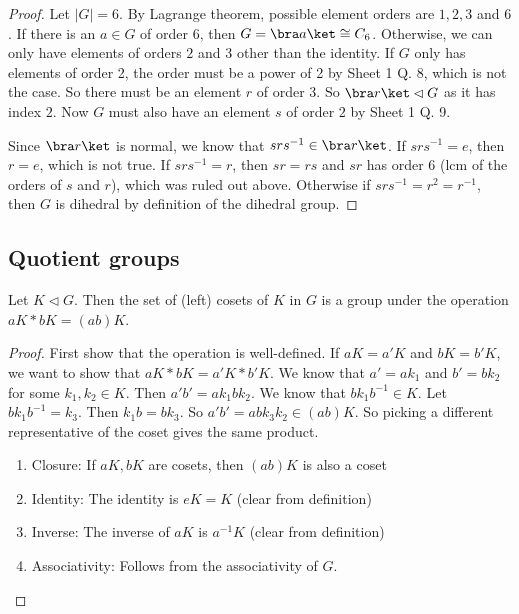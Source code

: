 \documentclass[a4paper]{article}
\begin{document}
\begin{proof}
  Let $|G| = 6$. By Lagrange theorem, possible element orders are $1, 2, 3$ and $6$. If there is an $a\in G$ of order $6$, then $G = \bra a\ket \cong C_6$. Otherwise, we can only have elements of orders $2$ and $3$ other than the identity. If $G$ only has elements of order 2, the order must be a power of 2 by Sheet 1 Q. 8, which is not the case. So there must be an element $r$ of order 3. So $\bra r\ket\lhd G$ as it has index $2$. Now $G$ must also have an element $s$ of order $2$ by Sheet 1 Q. 9.

  Since $\bra r\ket$ is normal, we know that $srs^{-1}\in \bra r\ket$. If $srs^{-1} = e$, then $r = e$, which is not true. If $srs^{-1} = r$, then $sr = rs$ and $sr$ has order $6$ (lcm of the orders of $s$ and $r$), which was ruled out above. Otherwise if $srs^{-1} = r^2 = r^{-1}$, then $G$ is dihedral by definition of the dihedral group.
\end{proof}

\subsection{Quotient groups}
\begin{prop}
  Let $K\lhd G$. Then the set of (left) cosets of $K$ in $G$ is a group under the operation $aK*bK = (ab)K$.
\end{prop}

\begin{proof}
  First show that the operation is well-defined. If $aK = a'K$ and $bK = b'K$, we want to show that $aK*bK = a'K * b'K$. We know that $a' = ak_1$ and $b' = bk_2$ for some $k_1, k_2\in K$. Then $a'b' = ak_1bk_2$. We know that $bk_1b^{-1}\in K$. Let $bk_1b^{-1} = k_3$. Then $k_1 b = bk_3$. So $a'b' = abk_3k_2\in (ab)K$. So picking a different representative of the coset gives the same product.
  \begin{enumerate}[label=\arabic{*}.]
    \item Closure: If $aK, bK$ are cosets, then $(ab)K$ is also a coset
    \item Identity: The identity is $eK = K$ (clear from definition)
    \item Inverse: The inverse of $aK$ is $a^{-1}K$ (clear from definition)
    \item Associativity: Follows from the associativity of $G$.\qedhere
  \end{enumerate}
\end{proof}
\end{document}
